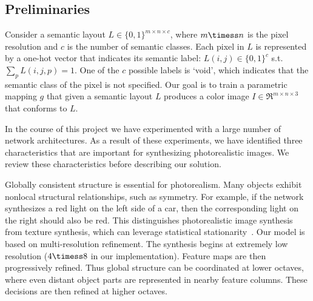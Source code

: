 \subsection{Preliminaries}

Consider a semantic layout $L \in \{0,1\}^{m\times n \times c}$, where $m\timess n$ is the pixel resolution and $c$ is the number of semantic classes. Each pixel in $L$ is represented by a one-hot vector that indicates its semantic label: ${L(i,j) \in \{0,1\}^c}$ s.t. ${\sum_{p}L(i,j,p)=1}$. One of the $c$ possible labels is `void', which indicates that the semantic class of the pixel is not specified.
Our goal is to train a parametric mapping $g$ that given a semantic layout $L$ produces a color image ${I \in \Re^{m\times n \times 3}}$ that conforms to $L$.

In the course of this project we have experimented with a large number of network architectures.
As a result of these experiments, we have identified three characteristics that are important for synthesizing photorealistic images. We review these characteristics before describing our solution.

Globally consistent structure is essential for photorealism. Many objects exhibit nonlocal structural relationships, such as symmetry. For example, if the network synthesizes a red light on the left side of a car, then the corresponding light on the right should also be red. This distinguishes photorealistic image synthesis from texture synthesis, which can leverage statistical stationarity~\cite{PortillaSimoncelli2000}. Our model is based on multi-resolution refinement. The synthesis begins at extremely low resolution ($4\timess 8$ in our implementation). Feature maps are then progressively refined. Thus global structure can be coordinated at lower octaves, where even distant object parts are represented in nearby feature columns. These decisions are then refined at higher octaves.


